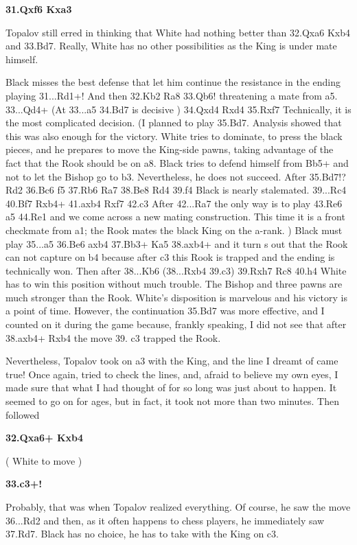 \documentclass[
	11pt,twocolumn]{article}
\renewcommand{\bf}{\bfseries}
\begin{document}
{\bf 31.Qxf6 Kxa3 }

Topalov still erred in thinking that White had nothing better than 32.Qxa6 Kxb4 and 33.Bd7. Really, White has no other possibilities as the King is under mate himself.



Black misses the best defense that let him continue the resistance in the ending playing 31...Rd1+!  And then 32.Kb2 Ra8 33.Qb6!  threatening a mate from a5. 33...Qd4+ (At 33...a5 34.Bd7 is decisive ) 34.Qxd4 Rxd4 35.Rxf7  Technically, it is the most complicated decision. (I planned to play 35.Bd7. Analysis showed that this was also enough for the victory. White tries to dominate, to press the black pieces, and he prepares to move the King-side pawns, taking advantage of the fact that the Rook should be on a8. Black tries to defend himself from Bb5+ and not to let the Bishop go to b3. Nevertheless, he does not succeed. After 35.Bd7!? Rd2 36.Bc6 f5 37.Rb6 Ra7 38.Be8 Rd4 39.f4  Black is nearly stalemated. 39...Rc4 40.Bf7 Rxb4+ 41.axb4 Rxf7 42.c3  After 42...Ra7  the only way is to play 43.Re6 a5 44.Re1 and we come across a new mating construction. This time it is a front checkmate from a1; the Rook mates the black King on the a-rank. ) Black must play 35...a5 36.Be6 axb4 37.Bb3+ Ka5 38.axb4+  and it turn s out that the Rook can not capture on b4 because after c3 this Rook is trapped and the ending is technically won. Then after 38...Kb6 (38...Rxb4 39.c3) 39.Rxh7 Rc8 40.h4 White has to win this position without much trouble. The Bishop and three pawns are much stronger than the Rook. White's disposition is marvelous and his victory is a point of time. However, the continuation 35.Bd7 was more effective, and I counted on it during the game because, frankly speaking, I did not see that after 38.axb4+ Rxb4 the move 39. c3 trapped the Rook. 



Nevertheless, Topalov took on a3 with the King, and the line I dreamt of came true! Once again, tried to check the lines, and, afraid to believe my own eyes, I made sure that what I had thought of for so long was just about to happen. It seemed to go on for ages, but in fact, it took not more than two minutes. Then followed

{\bf 32.Qxa6+ Kxb4 }

( White to move )

{\bf 33.c3+! }

Probably, that was when Topalov realized everything. Of course, he saw the move 36...Rd2 and then, as it often happens to chess players, he immediately saw 37.Rd7. Black has no choice, he has to take with the King on c3.
\end{document}

